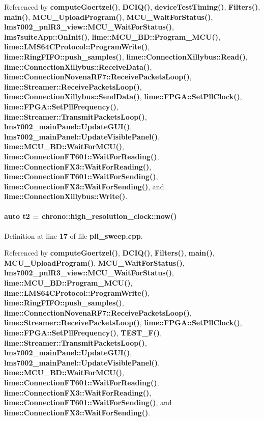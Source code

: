 Referenced by {\bf compute\+Goertzel()}, {\bf D\+C\+I\+Q()}, {\bf device\+Test\+Timing()}, {\bf Filters()}, {\bf main()}, {\bf M\+C\+U\+\_\+\+Upload\+Program()}, {\bf M\+C\+U\+\_\+\+Wait\+For\+Status()}, {\bf lms7002\+\_\+pnl\+R3\+\_\+view\+::\+M\+C\+U\+\_\+\+Wait\+For\+Status()}, {\bf lms7suite\+App\+::\+On\+Init()}, {\bf lime\+::\+M\+C\+U\+\_\+\+B\+D\+::\+Program\+\_\+\+M\+C\+U()}, {\bf lime\+::\+L\+M\+S64\+C\+Protocol\+::\+Program\+Write()}, {\bf lime\+::\+Ring\+F\+I\+F\+O\+::push\+\_\+samples()}, {\bf lime\+::\+Connection\+Xillybus\+::\+Read()}, {\bf lime\+::\+Connection\+Xillybus\+::\+Receive\+Data()}, {\bf lime\+::\+Connection\+Novena\+R\+F7\+::\+Receive\+Packets\+Loop()}, {\bf lime\+::\+Streamer\+::\+Receive\+Packets\+Loop()}, {\bf lime\+::\+Connection\+Xillybus\+::\+Send\+Data()}, {\bf lime\+::\+F\+P\+G\+A\+::\+Set\+Pll\+Clock()}, {\bf lime\+::\+F\+P\+G\+A\+::\+Set\+Pll\+Frequency()}, {\bf lime\+::\+Streamer\+::\+Transmit\+Packets\+Loop()}, {\bf lms7002\+\_\+main\+Panel\+::\+Update\+G\+U\+I()}, {\bf lms7002\+\_\+main\+Panel\+::\+Update\+Visible\+Panel()}, {\bf lime\+::\+M\+C\+U\+\_\+\+B\+D\+::\+Wait\+For\+M\+C\+U()}, {\bf lime\+::\+Connection\+F\+T601\+::\+Wait\+For\+Reading()}, {\bf lime\+::\+Connection\+F\+X3\+::\+Wait\+For\+Reading()}, {\bf lime\+::\+Connection\+F\+T601\+::\+Wait\+For\+Sending()}, {\bf lime\+::\+Connection\+F\+X3\+::\+Wait\+For\+Sending()}, and {\bf lime\+::\+Connection\+Xillybus\+::\+Write()}.

\paragraph[{t2}]{\setlength{\rightskip}{0pt plus 5cm}auto t2 = chrono\+::high\+\_\+resolution\+\_\+clock\+::now()}\label{pll__sweep_8cpp_a0919167e1fe8808c6ede9a583b3e2762}


Definition at line {\bf 17} of file {\bf pll\+\_\+sweep.\+cpp}.



Referenced by {\bf compute\+Goertzel()}, {\bf D\+C\+I\+Q()}, {\bf Filters()}, {\bf main()}, {\bf M\+C\+U\+\_\+\+Upload\+Program()}, {\bf M\+C\+U\+\_\+\+Wait\+For\+Status()}, {\bf lms7002\+\_\+pnl\+R3\+\_\+view\+::\+M\+C\+U\+\_\+\+Wait\+For\+Status()}, {\bf lime\+::\+M\+C\+U\+\_\+\+B\+D\+::\+Program\+\_\+\+M\+C\+U()}, {\bf lime\+::\+L\+M\+S64\+C\+Protocol\+::\+Program\+Write()}, {\bf lime\+::\+Ring\+F\+I\+F\+O\+::push\+\_\+samples()}, {\bf lime\+::\+Connection\+Novena\+R\+F7\+::\+Receive\+Packets\+Loop()}, {\bf lime\+::\+Streamer\+::\+Receive\+Packets\+Loop()}, {\bf lime\+::\+F\+P\+G\+A\+::\+Set\+Pll\+Clock()}, {\bf lime\+::\+F\+P\+G\+A\+::\+Set\+Pll\+Frequency()}, {\bf T\+E\+S\+T\+\_\+\+F()}, {\bf lime\+::\+Streamer\+::\+Transmit\+Packets\+Loop()}, {\bf lms7002\+\_\+main\+Panel\+::\+Update\+G\+U\+I()}, {\bf lms7002\+\_\+main\+Panel\+::\+Update\+Visible\+Panel()}, {\bf lime\+::\+M\+C\+U\+\_\+\+B\+D\+::\+Wait\+For\+M\+C\+U()}, {\bf lime\+::\+Connection\+F\+T601\+::\+Wait\+For\+Reading()}, {\bf lime\+::\+Connection\+F\+X3\+::\+Wait\+For\+Reading()}, {\bf lime\+::\+Connection\+F\+T601\+::\+Wait\+For\+Sending()}, and {\bf lime\+::\+Connection\+F\+X3\+::\+Wait\+For\+Sending()}.

